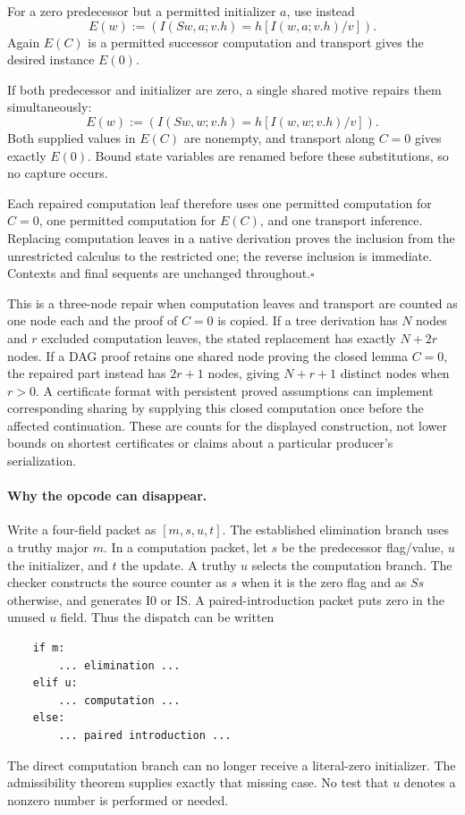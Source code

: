 \documentclass[11pt,letterpaper]{article}
\theoremstyle{definition}\newtheorem{definition}[theorem]{Definition}
\theoremstyle{remark}\newtheorem{remark}[theorem]{Remark}
\begin{document}
For a zero predecessor but a permitted initializer $a$, use instead
\[
 E(w):=\left(I(Sw,a;v.h)=h[I(w,a;v.h)/v]\right).
\]
Again $E(C)$ is a permitted successor computation and transport gives
the desired instance $E(0)$.

If both predecessor and initializer are zero, a single shared motive
repairs them simultaneously:
\[
 E(w):=\left(I(Sw,w;v.h)=h[I(w,w;v.h)/v]\right).
\]
Both supplied values in $E(C)$ are nonempty, and transport along $C=0$
gives exactly $E(0)$.  Bound state variables are renamed before these
substitutions, so no capture occurs.

Each repaired computation leaf therefore uses one permitted computation
for $C=0$, one permitted computation for $E(C)$, and one transport
inference.  Replacing computation leaves in a native derivation proves
the inclusion from the unrestricted calculus to the restricted one;
the reverse inclusion is immediate.  Contexts and final sequents are
unchanged throughout.\hfill$\square$

This is a three-node repair when computation leaves and transport are
counted as one node each and the proof of $C=0$ is copied.  If a tree
derivation has $N$ nodes and $r$ excluded computation leaves, the stated
replacement has exactly $N+2r$ nodes.  If a DAG proof retains one shared
node proving the closed lemma $C=0$, the repaired part instead has
$2r+1$ nodes, giving $N+r+1$ distinct nodes when $r>0$.  A certificate
format with persistent proved assumptions can implement corresponding
sharing by supplying this closed computation once before the affected
continuation.  These are counts for the displayed construction, not
lower bounds on shortest certificates or claims about a particular
producer's serialization.

\paragraph{Why the opcode can disappear.}
Write a four-field packet as $[m,s,u,t]$.  The established elimination
branch uses a truthy major $m$.  In a computation packet, let $s$ be the
predecessor flag/value, $u$ the initializer, and $t$ the update.  A truthy
$u$ selects the computation branch.  The checker constructs the source
counter as $s$ when it is the zero flag and as $Ss$ otherwise, and
generates I0 or IS.  A paired-introduction packet puts zero in the unused
$u$ field.  Thus the dispatch can be written
\begin{verbatim}
    if m:
        ... elimination ...
    elif u:
        ... computation ...
    else:
        ... paired introduction ...
\end{verbatim}
The direct computation branch can no longer receive a literal-zero
initializer.  The admissibility theorem supplies exactly that missing
case.  No test that $u$ denotes a nonzero number is performed or needed.
\end{document}
